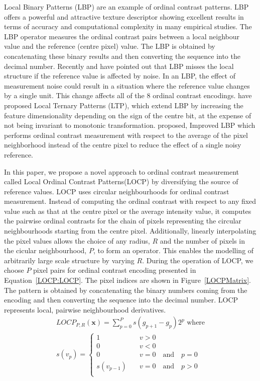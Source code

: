 \documentclass[a4paper, 10pt, conference]{ieeeconf}      %
\begin{document}
Local Binary Patterns (LBP) \cite{conf/SPIE/pietikaeinenONH94} are an example of ordinal contrast patterns.
LBP offers a powerful and attractive texture descriptor showing excellent results in terms of accuracy and computational complexity in many empirical studies. 
The LBP operator measures the ordinal contrast pairs between a local neighbour value and the reference (centre pixel) value. 
The LBP is obtained by concatenating these binary results and then converting the sequence into the decimal number. 
Recently \cite{conf/icig/Jin04} and \cite{conf/amfg/TanT07} have pointed out that LBP misses the local structure if the reference value is affected by noise. 
In an LBP, the effect of measurement noise could result in a situation where the reference value changes by a single unit. 
This change affects all of the 8 ordinal contrast encodings. 
\cite{conf/amfg/TanT07} have proposed Local Ternary Patterns (LTP), which extend LBP by increasing the feature dimensionality depending on the sign of the centre bit, at the expense of not being invariant to monotonic transformation.
\cite{conf/icig/Jin04} proposed, Improved LBP which performs ordinal contrast measurement with respect to the average of the pixel neighborhood instead of the centre pixel to reduce the effect of a single noisy reference. 

In this paper, we propose a novel approach to ordinal contrast measurement called Local Ordinal Contrast Patterns(LOCP) by diversifying the source of reference values. 
LOCP uses circular neighbourhoods for ordinal contrast measurement. 
Instead of computing the ordinal contrast with respect to any fixed  value such as that at the centre pixel or the average intensity value, it computes the pairwise ordinal contrasts for the chain of pixels representing the circular neighbourhoods starting from the centre pixel. Additionally, linearly interpolating the pixel values allows the choice of any radius, \(R\) and the number of pixels in the cicular neighbourhood, \(P\), to form an operator. 
This enables the modelling of arbitrarily large scale structure by varying $R$.  
During the operation of LOCP, we choose \(P\) pixel pairs for ordinal contrast encoding presented in Equation~\ref{LOCP:LOCP}. 
The pixel indices are shown in Figure~\ref{LOCPMatrix}. 
The pattern is obtained by concatenating the binary numbers coming from the encoding and then converting the sequence into the decimal number. 
LOCP represents local, pairwise neighbourhood derivatives. 
\begin{eqnarray}
\label{LOCP:LOCP}
  LOCP_{P,R}(\mathbf{x})=\sum_{p=0}^{P}s(g_{p+1}-g_p)2^p \mbox{ where} \nonumber \\
s(v_p)=
 \begin{cases}
  1 & \quad v>0 \\
  0 & \quad v<0\\
  0 & \quad v=0 \quad\mbox{and}\quad p=0 \\
  s(v_{p-1})& \quad v=0 \quad\mbox{and}\quad p>0\\
\end{cases}
\end{eqnarray}
\end{document}

